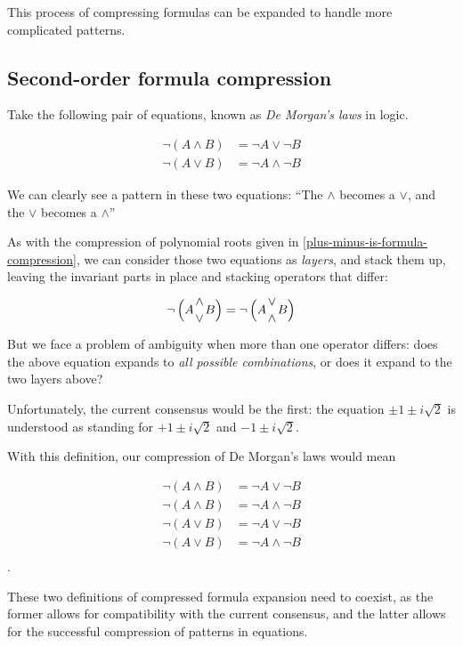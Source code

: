 \documentclass{article}
\theoremstyle{definition}
\begin{document}
This process of compressing formulas can be expanded to handle more complicated patterns.

\subsection{Second-order formula compression}

Take the following pair of equations, known as \emph{De Morgan's laws} in logic.

\begin{align*}
	\lnot (A \land B) &= \lnot A \lor \lnot B \tag{top layer} \\
	\lnot (A \lor B) &= \lnot A \land \lnot B \tag{bottom layer}
\end{align*}

We can clearly see a pattern in these two equations: ``The $\land$ becomes a $\lor$, and the $\lor$ becomes a $\land$''

As with the compression of polynomial roots given in \ref{plus-minus-is-formula-compression}, we can consider those two equations as \emph{layers}, and stack them up, leaving the invariant parts in place and stacking operators that differ:

\begin{align*}
	\lnot \left(A {\land \atop \lor} B\right) &= \lnot \left(A {\lor \atop \land} B\right) \\
\end{align*}

But we face a problem of ambiguity when more than one operator differs: does the above equation expands to \emph{all possible combinations}, or does it expand to the two layers above?

Unfortunately, the current consensus would be the first: the equation $\pm 1 \pm i \sqrt{2} $ is understood as standing for $+ 1 \pm i \sqrt{2} $ and $-1\pm i\sqrt{2} $.

With this definition, our compression of De Morgan's laws would mean

\begin{align*}
	\lnot(A \land B) &= \lnot A \lor \lnot B \\
	\lnot(A \land B) &= \lnot A \land \lnot B \\
	\lnot(A \lor B) &= \lnot A \lor \lnot B \\
	\lnot(A \lor B) &= \lnot A \land \lnot B \\
\end{align*}.

These two definitions of compressed formula expansion need to coexist, as the former allows for compatibility with the current consensus, and the latter allows for the successful compression of patterns in equations.
\end{document}

